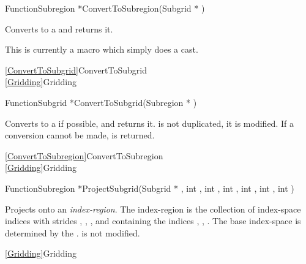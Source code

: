 {\newpage\clearpage
{}%
\begin{deftypefn}{Function}{Subregion *}{ConvertToSubregion}({Subgrid *} )
\par
\DESCRIPTION
Converts  to a  and returns it.
\par
\NOTES
This is currently a macro which simply does a cast.
\par
\SEEALSO
\vref{ConvertToSubgrid}{ConvertToSubgrid}\\
\vref{Gridding}{Gridding}
\par
\end{deftypefn}%
\lthtmlfigureZ
\lthtmlcheckvsize\clearpage}

{\newpage\clearpage
{}%
\begin{deftypefn}{Function}{Subgrid *}{ConvertToSubgrid}({Subregion *} )
\par
\DESCRIPTION
Converts  to a  if possible,
and returns it.
 is not duplicated, it is modified.
If a conversion cannot be made,  is returned.
\par
\SEEALSO
\vref{ConvertToSubregion}{ConvertToSubregion}\\
\vref{Gridding}{Gridding}
\par
\end{deftypefn}%
\lthtmlfigureZ
\lthtmlcheckvsize\clearpage}

{\newpage\clearpage
{}%
\begin{deftypefn}{Function}{Subregion *}{ProjectSubgrid}({Subgrid *} , int , int , int , int , int , int )
\par
\DESCRIPTION
Projects  onto an {\em index-region}.
The index-region is the collection of index-space indices with
strides , , , and containing
the indices , , .
The base index-space is determined by the .
 is not modified.
\par
\SEEALSO
\vref{Gridding}{Gridding}
\par
\end{deftypefn}%
\lthtmlfigureZ
\lthtmlcheckvsize\clearpage}

